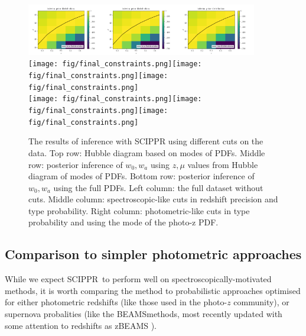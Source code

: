 \documentclass[12pt, twocolumn]{emulateapj}
\newcommand{\SCIPPR}{\textsc{SCIPPR}~}
\newcommand{\BEAMS}{\textsc{BEAMS}}
\begin{document}
\begin{figure}
	\begin{center}
	    \includegraphics[width=0.3\textwidth]{fig/sn_interim_prior.png}\includegraphics[width=0.3\textwidth]{fig/sn_interim_prior.png}\includegraphics[width=0.3\textwidth]{fig/sn_interim_prior.png}\\
		\texttt{[image: fig/final\_constraints.png]}\texttt{[image: fig/final\_constraints.png]}\texttt{[image: fig/final\_constraints.png]}\\
		\texttt{[image: fig/final\_constraints.png]}\texttt{[image: fig/final\_constraints.png]}\texttt{[image: fig/final\_constraints.png]}
		\caption{The results of inference with SCIPPR using different cuts on the data.  
		Top row: Hubble diagram based on modes of PDFs.  
		Middle row: posterior inference of $w_{0}, w_{a}$ using $z, \mu$ values from Hubble diagram of modes of PDFs.  
		Bottom row: posterior inference of $w_{0}, w_{a}$ using the full PDFs.  
		Left column: the full dataset without cuts.  
		Middle column: spectroscopic-like cuts in redshift precision and type probability.  
		Right column: photometric-like cuts in type probability and using the mode of the photo-z PDF.}
		\label{fig:scippr_final1}
	\end{center}
\end{figure}


\subsection{Comparison to simpler photometric approaches}

While we expect \SCIPPR to perform well on spectroscopically-motivated methods, it is worth comparing the method to probabilistic approaches optimised for either photometric redshifts (like those used in the photo-$z$ community), or supernova probalities (like the \BEAMS methods, most recently updated with some attention to redshifts as zBEAMS \cite{Roberts_2017}).
\end{document}
